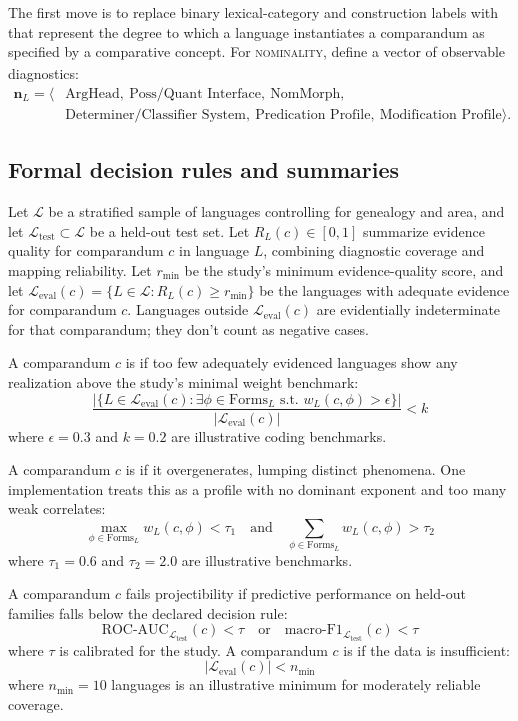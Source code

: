 \documentclass[12pt]{article}
\begin{document}
The first move is to replace binary lexical-category and construction labels with  that represent the degree to which a language instantiates a comparandum as specified by a comparative concept. For \textsc{nominality}\textsubscript{\Cross}, define a vector of observable diagnostics:
\[
  \begin{aligned}
  \mathbf{n}_L = \big\langle
     &\text{ArgHead},\ \text{Poss/Quant Interface},\ \text{NomMorph},\\
     &\text{Determiner/Classifier System},\ \text{Predication Profile},\ \text{Modification Profile}
  \big\rangle.
  \end{aligned}
\]

\subsection{Formal decision rules and summaries}\label{subsec:failure-formal}

Let $\mathcal{L}$ be a stratified sample of languages controlling for genealogy and area, and let $\mathcal{L}_{\text{test}} \subset \mathcal{L}$ be a held-out test set. Let $R_L(c) \in [0,1]$ summarize evidence quality for comparandum $c$ in language $L$, combining diagnostic coverage and mapping reliability. Let $r_{\min}$ be the study's minimum evidence-quality score, and let $\mathcal{L}_{\text{eval}}(c) = \{L \in \mathcal{L} : R_L(c) \geq r_{\min}\}$ be the languages with adequate evidence for comparandum $c$. Languages outside $\mathcal{L}_{\text{eval}}(c)$ are evidentially indeterminate for that comparandum; they don't count as negative cases.

A comparandum $c$ is  if too few adequately evidenced languages show any realization above the study's minimal weight benchmark:
\[
  \frac{|\{L \in \mathcal{L}_{\text{eval}}(c) : \exists \phi \in \mathrm{Forms}_L \text{ s.t. } w_L(c,\phi) > \epsilon\}|}{|\mathcal{L}_{\text{eval}}(c)|} < k
\]
where $\epsilon = 0.3$ and $k = 0.2$ are illustrative coding benchmarks.

A comparandum $c$ is  if it overgenerates, lumping distinct phenomena. One implementation treats this as a profile with no dominant exponent and too many weak correlates:
\[
  \max_{\phi \in \mathrm{Forms}_L} w_L(c,\phi) < \tau_1 \quad \text{and} \quad \sum_{\phi \in \mathrm{Forms}_L} w_L(c,\phi) > \tau_2
\]
where $\tau_1 = 0.6$ and $\tau_2 = 2.0$ are illustrative benchmarks.

A comparandum $c$ fails projectibility if predictive performance on held-out families falls below the declared decision rule:
\[
  \text{ROC-AUC}_{\mathcal{L}_{\text{test}}}(c) < \tau \quad \text{or} \quad \text{macro-F1}_{\mathcal{L}_{\text{test}}}(c) < \tau
\]
where $\tau$ is calibrated for the study. A comparandum $c$ is  if the data is insufficient:
\[
  |\mathcal{L}_{\text{eval}}(c)| < n_{\text{min}}
\]
where $n_{\text{min}} = 10$ languages is an illustrative minimum for moderately reliable coverage.
\end{document}
